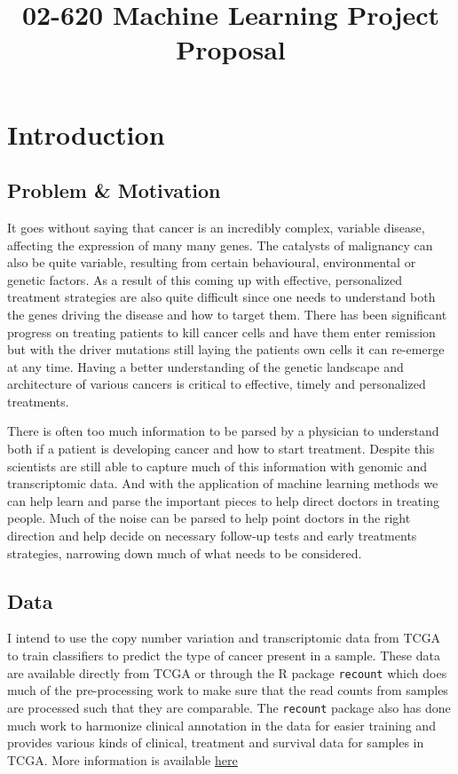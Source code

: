 
\title{02-620 Machine Learning Project \\
        \large Proposal}



\maketitle

\section{Introduction}

\subsection{Problem \& Motivation}
It goes without saying that cancer is an incredibly complex, variable disease, affecting the expression of many many genes.
The catalysts of malignancy can also be quite variable, resulting from certain behavioural, environmental or genetic factors.
As a result of this coming up with effective, personalized treatment strategies are also quite difficult since one needs to understand both the genes driving the disease and how to target them.
There has been significant progress on treating patients to kill cancer cells and have them enter remission but with the driver mutations still laying the patients own cells it can re-emerge at any time.
Having a better understanding of the genetic landscape and architecture of various cancers is critical to effective, timely and personalized treatments.

There is often too much information to be parsed by a physician to understand both if a patient is developing cancer and how to start treatment.
Despite this scientists are still able to capture much of this information with genomic and transcriptomic data.
And with the application of machine learning methods we can help learn and parse the important pieces to help direct doctors in treating people.
Much of the noise can be parsed to help point doctors in the right direction and help decide on necessary follow-up tests and early treatments strategies, narrowing down much of what needs to be considered.

\subsection{Data}
I intend to use the copy number variation and transcriptomic data from TCGA to train classifiers to predict the type of cancer present in a sample.
These data are available directly from TCGA or through the R package \verb|recount| which does much of the pre-processing work to make sure that the read counts from samples are processed such that they are comparable.
The \verb|recount| package also has done much work to harmonize clinical annotation in the data for easier training and provides various kinds of clinical, treatment and survival data for samples in TCGA.
More information is available \href{https://jhubiostatistics.shinyapps.io/recount/}{\underline{here}}

